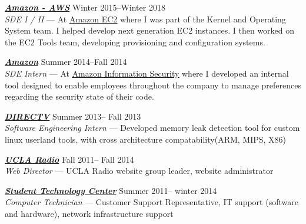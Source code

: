 \documentclass[line,letterpaper]{resume}
\begin{document}
\begin{resume}
	{\sl\textbf{\href{https://aws.amazon.com/}{Amazon - AWS}}} \hfill Winter 2015--Winter 2018\\
    \emph{SDE I / II } --- At \underline{\href{http://aws.amazon.com/ec2}
	{Amazon EC2}} where I was part of the Kernel and Operating System team. I helped
	develop next generation EC2 instances. I then worked on the EC2 Tools team,
        developing provisioning and configuration systems.

	{\sl\textbf{\href{www.amazon.com}{Amazon}}} \hfill Summer 2014--Fall 2014\\
    \emph{SDE Intern} --- At \underline{\href{https://www.amazon.jobs/en/teams/infosec}
    {Amazon Information Security}} where I developed an internal tool designed to
	enable employees throughout the company to manage preferences regarding the
	security state of their code.

    {\sl\textbf{\href{www.directv.com}{DIRECTV}}} \hfill Summer 2013-- Fall 2013\\
    \emph{Software Engineering Intern}
    ---  Developed memory leak detection tool for custom linux userland tools,
	with cross architecture compatability(ARM, MIPS, X86)

    {\sl\textbf{\href{https://uclaradio.com}{UCLA Radio}}} \hfill Fall 2011-- Fall 2014\\
    \emph{Web Director} --- UCLA Radio website group leader, website administrator

    {\sl\textbf{\href{https://housing.ucla.edu/residence-hall-computing}
	{Student Technology Center}}} \hfill Summer 2011-- winter 2014\\
    \emph{Computer Technician} --- Customer Support Representative,
IT support (software and hardware), network infrastructure support
    \vspace{-6pt}



\end{resume}
\end{document}
